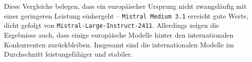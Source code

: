 Diese Vergleiche belegen, dass ein europäischer Ursprung nicht zwangsläufig mit einer geringeren Leistung einhergeht – \texttt{Mistral Medium 3.1} erreicht gute Werte, dicht gefolgt von \texttt{Mistral-Large-Instruct-2411}. Allerdings zeigen die Ergebnisse auch, dass einige europäische Modelle hinter den internationalen Konkurrenten zurückbleiben. Insgesamt sind die internationalen Modelle im Durchschnitt leistungsfähiger und stabiler.